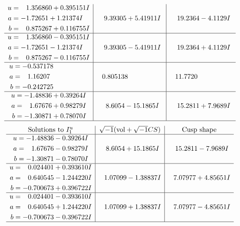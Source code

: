 \documentclass[1p]{elsarticle_modified}
\theoremstyle{definition}
\newcommand{\I}{\sqrt{-1}}
\begin{document}
$$\begin{array}{c|c|c}
\begin{aligned}
u &= \phantom{-}1.356860 + 0.395151 I \\
a &= -1.72651 + 1.21374 I \\
b &= \phantom{-}0.875267 + 0.116755 I\end{aligned}
 & \phantom{-}9.39305 + 5.41911 I & \phantom{-}19.2364 - 4.1129 I \\ \hline\begin{aligned}
u &= \phantom{-}1.356860 - 0.395151 I \\
a &= -1.72651 - 1.21374 I \\
b &= \phantom{-}0.875267 - 0.116755 I\end{aligned}
 & \phantom{-}9.39305 - 5.41911 I & \phantom{-}19.2364 + 4.1129 I \\ \hline\begin{aligned}
u &= -0.537178\phantom{ +0.000000I} \\
a &= \phantom{-}1.16207\phantom{ +0.000000I} \\
b &= -0.242725\phantom{ +0.000000I}\end{aligned}
 & \phantom{-}0.805138\phantom{ +0.000000I} & \phantom{-}11.7720\phantom{ +0.000000I} \\ \hline\begin{aligned}
u &= -1.48836 + 0.39264 I \\
a &= \phantom{-}1.67676 + 0.98279 I \\
b &= -1.30871 + 0.78070 I\end{aligned}
 & \phantom{-}8.6054 - 15.1865 I & \phantom{-}15.2811 + 7.9689 I\\
 \hline 
 \end{array}$$\newpage$$\begin{array}{c|c|c}  
\text{Solutions to }I^u_{1}& \I (\text{vol} + \sqrt{-1}CS) & \text{Cusp shape}\\
 \hline 
\begin{aligned}
u &= -1.48836 - 0.39264 I \\
a &= \phantom{-}1.67676 - 0.98279 I \\
b &= -1.30871 - 0.78070 I\end{aligned}
 & \phantom{-}8.6054 + 15.1865 I & \phantom{-}15.2811 - 7.9689 I \\ \hline\begin{aligned}
u &= \phantom{-}0.024401 + 0.393610 I \\
a &= \phantom{-}0.640545 - 1.244220 I \\
b &= -0.700673 + 0.396722 I\end{aligned}
 & \phantom{-}1.07099 - 1.38837 I & \phantom{-}7.07977 + 4.85651 I \\ \hline\begin{aligned}
u &= \phantom{-}0.024401 - 0.393610 I \\
a &= \phantom{-}0.640545 + 1.244220 I \\
b &= -0.700673 - 0.396722 I\end{aligned}
 & \phantom{-}1.07099 + 1.38837 I & \phantom{-}7.07977 - 4.85651 I\\
 \hline 
 \end{array}$$\newpage\newpage\renewcommand{\arraystretch}{1}
\end{document}

